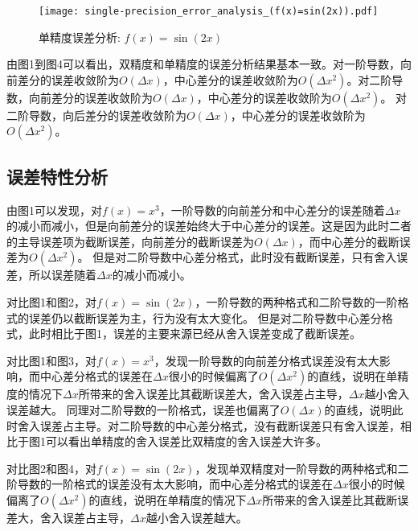 \documentclass[12pt,a4paper]{article}
\begin{document}
\begin{figure}[!htbp]
    \centering
    \texttt{[image: single-precision\_error\_analysis\_(f(x)=sin(2x)).pdf]}
    \caption{单精度误差分析: $f(x) = \sin(2x)$}
\end{figure}
\newpage

由图1到图4可以看出，双精度和单精度的误差分析结果基本一致。对一阶导数，向前差分的误差收敛阶为$O(\Delta x)$，中心差分的误差收敛阶为$O(\Delta x^2)$。对二阶导数，向前差分的误差收敛阶为$O(\Delta x)$，中心差分的误差收敛阶为$O(\Delta x^2)$。
对二阶导数，向后差分的误差收敛阶为$O(\Delta x)$，中心差分的误差收敛阶为$O(\Delta x^2)$。

\subsection{误差特性分析}


由图1可以发现，对$f(x) = x^3$，一阶导数的向前差分和中心差分的误差随着$\Delta x$的减小而减小，但是向前差分的误差始终大于中心差分的误差。这是因为此时二者的主导误差项为截断误差，向前差分的截断误差为$O(\Delta x)$，而中心差分的截断误差为$O(\Delta x^2)$。
但是对二阶导数中心差分格式，此时没有截断误差，只有舍入误差，所以误差随着$\Delta x$的减小而减小。

对比图1和图2，对$f(x) = \sin(2x)$，一阶导数的两种格式和二阶导数的一阶格式的误差仍以截断误差为主，行为没有太大变化。
但是对二阶导数中心差分格式，此时相比于图1，误差的主要来源已经从舍入误差变成了截断误差。

对比图1和图3，对$f(x) = x^3$，发现一阶导数的向前差分格式误差没有太大影响，而中心差分格式的误差在$\Delta x$很小的时候偏离了$O(\Delta x^2)$的直线，说明在单精度的情况下$\Delta x$所带来的舍入误差比其截断误差大，舍入误差占主导，$\Delta x$越小舍入误差越大。
同理对二阶导数的一阶格式，误差也偏离了$O(\Delta x)$的直线，说明此时舍入误差占主导。对二阶导数的中心差分格式，没有截断误差只有舍入误差，相比于图1可以看出单精度的舍入误差比双精度的舍入误差大许多。

对比图2和图4，对$f(x) = \sin(2x)$，发现单双精度对一阶导数的两种格式和二阶导数的一阶格式的误差没有太大影响，而中心差分格式的误差在$\Delta x$很小的时候偏离了$O(\Delta x^2)$的直线，说明在单精度的情况下$\Delta x$所带来的舍入误差比其截断误差大，舍入误差占主导，$\Delta x$越小舍入误差越大。
\end{document}

